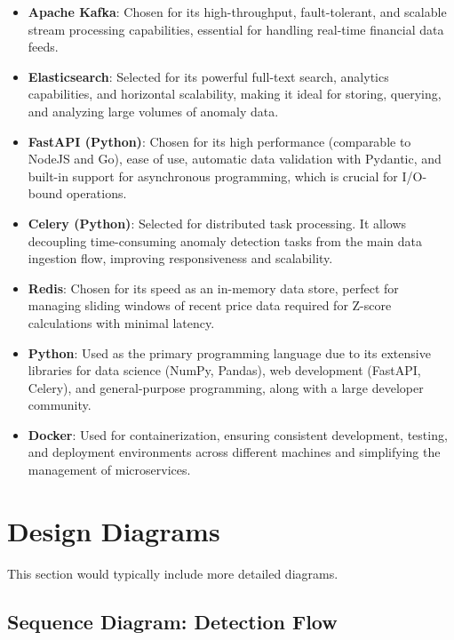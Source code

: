 \begin{itemize}
    \item \textbf{Apache Kafka}: Chosen for its high-throughput, fault-tolerant, and scalable stream processing capabilities, essential for handling real-time financial data feeds.
    
    \item \textbf{Elasticsearch}: Selected for its powerful full-text search, analytics capabilities, and horizontal scalability, making it ideal for storing, querying, and analyzing large volumes of anomaly data.
    
    \item \textbf{FastAPI (Python)}: Chosen for its high performance (comparable to NodeJS and Go), ease of use, automatic data validation with Pydantic, and built-in support for asynchronous programming, which is crucial for I/O-bound operations.
    
    \item \textbf{Celery (Python)}: Selected for distributed task processing. It allows decoupling time-consuming anomaly detection tasks from the main data ingestion flow, improving responsiveness and scalability.
    
    \item \textbf{Redis}: Chosen for its speed as an in-memory data store, perfect for managing sliding windows of recent price data required for Z-score calculations with minimal latency.
    
    \item \textbf{Python}: Used as the primary programming language due to its extensive libraries for data science (NumPy, Pandas), web development (FastAPI, Celery), and general-purpose programming, along with a large developer community.
    
    \item \textbf{Docker}: Used for containerization, ensuring consistent development, testing, and deployment environments across different machines and simplifying the management of microservices.
\end{itemize}

\section{Design Diagrams}

This section would typically include more detailed diagrams.

\subsection{Sequence Diagram: Detection Flow}


